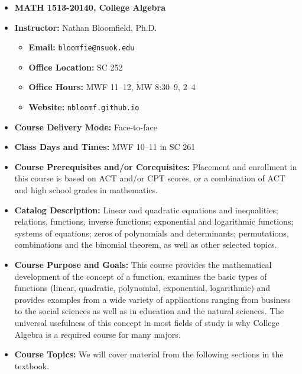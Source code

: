 \documentclass{article}
\begin{document}
\begin{itemize}
\item[] \textbf{\Large MATH 1513-20140, College Algebra}

\item \textbf{Instructor:} Nathan Bloomfield, Ph.D.
\begin{itemize}
\item[] \textbf{Email:} \texttt{bloomfie@nsuok.edu}
\item[] \textbf{Office Location:} SC 252 
\item[] \textbf{Office Hours:} MWF 11--12, MW 8:30--9, 2--4
\item[] \textbf{Website:} \texttt{nbloomf.github.io}
\end{itemize}


\item \textbf{Course Delivery Mode:} Face-to-face


\item \textbf{Class Days and Times:} MWF 10--11 in SC 261


\item \textbf{Course Prerequisites and/or Corequisites:} Placement and enrollment in this course is based on ACT and/or CPT scores, or a combination of ACT and high school grades in mathematics.


\item \textbf{Catalog Description:} Linear and quadratic equations and inequalities; relations, functions, inverse functions; exponential and logarithmic functions; systems of equations; zeros of polynomials and determinants; permutations, combinations and the binomial theorem, as well as other selected topics.


\item \textbf{Course Purpose and Goals:} This course provides the mathematical development of the concept of a function, examines the basic types of functions (linear, quadratic, polynomial, exponential, logarithmic) and provides examples from a wide variety of applications ranging from business to the social sciences as well as in education and the natural sciences. The universal usefulness of this concept in most fields of study is why College Algebra is a required course for many majors.


\item \textbf{Course Topics:} We will cover material from the following sections in the textbook.



\end{itemize}
\end{document}

